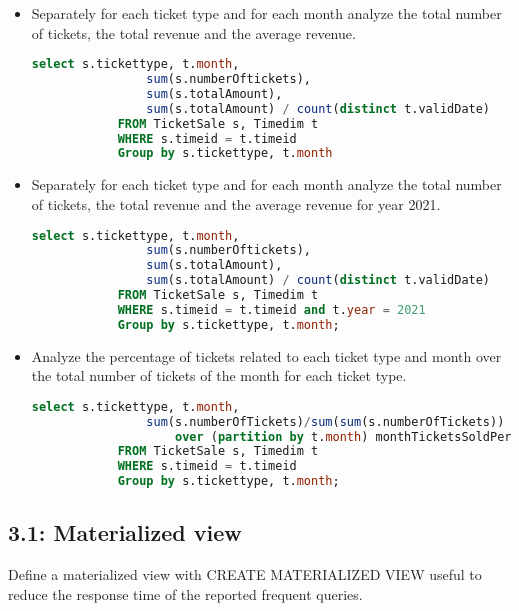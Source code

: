 \begin{question}
\begin{itemize}
\begin{lstlisting}[language=SQL]
       \end{lstlisting}
       \item
       Separately for each ticket type and for each month analyze the total number of
       tickets, the total revenue and the average revenue.
       \begin{lstlisting}[language = SQL]
            select s.tickettype, t.month,
                sum(s.numberOftickets),
                sum(s.totalAmount),
                sum(s.totalAmount) / count(distinct t.validDate)
            FROM TicketSale s, Timedim t
            WHERE s.timeid = t.timeid
            Group by s.tickettype, t.month
       \end{lstlisting}
       \pagebreak
       \item
       Separately for each ticket type and for each month analyze the total number of
       tickets, the total revenue and the average revenue for year 2021.
       \begin{lstlisting}[language = SQL]
            select s.tickettype, t.month,
                sum(s.numberOftickets),
                sum(s.totalAmount),
                sum(s.totalAmount) / count(distinct t.validDate)
            FROM TicketSale s, Timedim t
            WHERE s.timeid = t.timeid and t.year = 2021
            Group by s.tickettype, t.month;
       \end{lstlisting}
       \item
       Analyze the percentage of tickets related to each ticket type and month over the
       total number of tickets of the month for each ticket type.
       \begin{lstlisting}[language = SQL]
            select s.tickettype, t.month,
                sum(s.numberOfTickets)/sum(sum(s.numberOfTickets))
                    over (partition by t.month) monthTicketsSoldPercentage
            FROM TicketSale s, Timedim t
            WHERE s.timeid = t.timeid
            Group by s.tickettype, t.month;
       \end{lstlisting}
   \end{itemize}
\end{question}

\pagebreak

\subsection{3.1: Materialized view}

\begin{question}
    Define a materialized view with CREATE MATERIALIZED VIEW useful to
    reduce the response time of the reported frequent queries.
\end{question}

